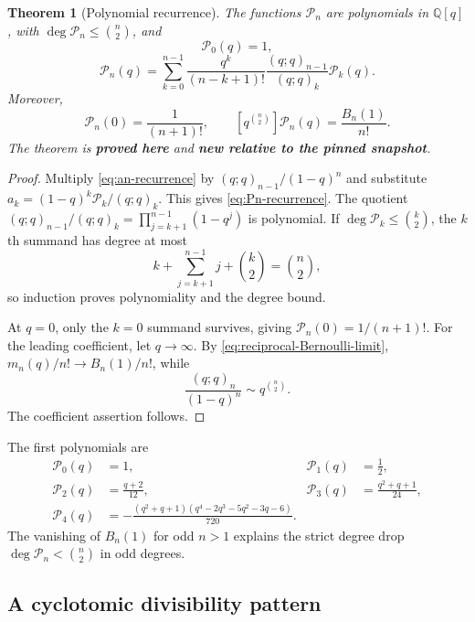 \documentclass[11pt,oneside]{article}
\numberwithin{equation}{section}
\newtheorem{theorem}{Theorem}[section]
\theoremstyle{definition}
\theoremstyle{remark}
\newcommand{\Q}{\mathbb Q}
\newcommand{\proved}{\textcolor{deepgreen}{\textbf{proved here}}}
\newcommand{\auditnew}{\textcolor{deepviolet}{\textbf{new relative to the pinned snapshot}}}
\begin{document}
\begin{theorem}[Polynomial recurrence]
\label{thm:Pn-recurrence}
The functions $\mathcal P_n$ are polynomials in $\Q[q]$, with
$\deg\mathcal P_n\le\binom n2$, and
\begin{equation}
 \mathcal P_0(q)=1,
 \label{eq:P0}
\end{equation}
\begin{equation}
 \boxed{
 \mathcal P_n(q)=
 \sum_{k=0}^{n-1}
 \frac{q^k}{(n-k+1)!}
 \frac{(q;q)_{n-1}}{(q;q)_k}\mathcal P_k(q).}
 \label{eq:Pn-recurrence}
\end{equation}
Moreover,
\begin{equation}
 \mathcal P_n(0)=\frac1{(n+1)!},
 \qquad
 [q^{\binom n2}]\mathcal P_n(q)=\frac{B_n(1)}{n!}.
 \label{eq:Pn-boundaries}
\end{equation}
The theorem is \proved{} and \auditnew.
\end{theorem}

\begin{proof}
Multiply \eqref{eq:an-recurrence} by
$(q;q)_{n-1}/(1-q)^n$ and substitute
$a_k=(1-q)^k\mathcal P_k/(q;q)_k$.  This gives
\eqref{eq:Pn-recurrence}.  The quotient
$(q;q)_{n-1}/(q;q)_k=\prod_{j=k+1}^{n-1}(1-q^j)$ is polynomial.  If
$\deg\mathcal P_k\le\binom k2$, the $k$th summand has degree at most
\[
 k+\sum_{j=k+1}^{n-1}j+\binom k2=\binom n2,
\]
so induction proves polynomiality and the degree bound.

At $q=0$, only the $k=0$ summand survives, giving
$\mathcal P_n(0)=1/(n+1)!$.  For the leading coefficient, let $q\to\infty$.
By \eqref{eq:reciprocal-Bernoulli-limit},
$m_n(q)/n!\to B_n(1)/n!$, while
\[
 \frac{(q;q)_n}{(1-q)^n}
 \sim q^{\binom n2}.
\]
The coefficient assertion follows.
\end{proof}

The first polynomials are
\begin{align}
 \mathcal P_0(q)&=1,
 &\mathcal P_1(q)&=\frac12,\nonumber\\
 \mathcal P_2(q)&=\frac{q+2}{12},
 &\mathcal P_3(q)&=\frac{q^2+q+1}{24},
 \label{eq:Pn-first-a}\\
 \mathcal P_4(q)&=
 -\frac{(q^2+q+1)(q^4-2q^3-5q^2-3q-6)}{720}.
 \label{eq:Pn-first-b}
\end{align}
The vanishing of $B_n(1)$ for odd $n>1$ explains the strict degree drop
$\deg\mathcal P_n<\binom n2$ in odd degrees.

\subsection{A cyclotomic divisibility pattern}
\end{document}
